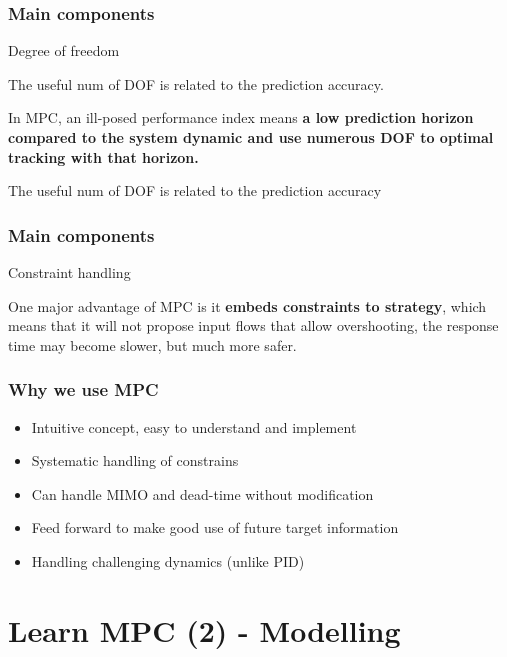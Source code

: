 \documentclass{beamer}
\begin{document}
\begin{frame}
\frametitle{Main components}

\begin{block}{Degree of freedom}

\end{block}
The useful num of DOF is related to the prediction accuracy. 
\medskip

In MPC, an ill-posed performance index means \textbf{a low prediction horizon compared to the system dynamic and use numerous DOF to optimal tracking with that horizon.}
\medskip

\begin{beamerboxesrounded}[upper=upcol,lower=lowcol,shadow=true]
	 
	The useful num of DOF is related to the prediction accuracy
\end{beamerboxesrounded}


\end{frame}

\begin{frame}
\frametitle{Main components}
\begin{block}{Constraint handling}
	
\end{block}

One major advantage of MPC is it \textbf{embeds constraints to strategy}, which means that it will not propose input flows that allow overshooting, the response time may become slower, but much more safer.

\end{frame}

\begin{frame}
\frametitle{Why we use MPC}

\begin{itemize}
	\item Intuitive concept, easy to understand and implement
\item	Systematic handling of constrains
\item	Can handle MIMO and dead-time without modification
\item	Feed forward to make good use of future target information
\item	Handling challenging dynamics (unlike PID)
\end{itemize}

\end{frame}



\section{Learn MPC (2) - Modelling}
\end{document}
